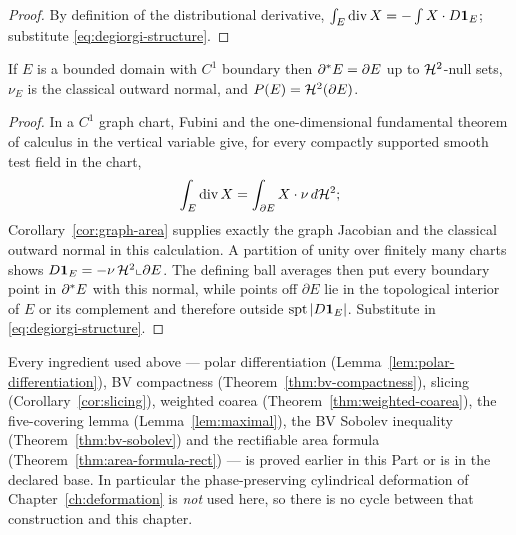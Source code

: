 \begin{proof}
By definition of the distributional derivative,
$\int_E\operatorname{div} X=-\int X\cdot D\mathbf 1_{E}$; substitute
\eqref{eq:degiorgi-structure}.
\end{proof}

\begin{corollary}\label{cor:smooth-perimeter}
If $E$ is a bounded domain with $C^1$ boundary then
$\partial^* E=\partial E$ up to $\mathcal H^2$-null sets, $\nu_E$ is the classical outward
normal, and $P(E)=\mathcal H^2(\partial E)$.
\end{corollary}

\begin{proof}
In a $C^1$ graph chart, Fubini and the one-dimensional fundamental theorem of
calculus in the vertical variable give, for every compactly supported smooth
test field in the chart,
\[
 \int_E\operatorname{div} X=\int_{\partial E}X\cdot\nu\,d\mathcal H^2;
\]
Corollary~\ref{cor:graph-area} supplies exactly the graph Jacobian and the
classical outward normal in this calculation.  A partition of unity over
finitely many charts shows
$D\mathbf 1_{E}=-\nu\,\mathcal H^2\llcorner\partial E$.  The defining ball averages then
put every boundary point in $\partial^* E$ with this normal, while points off
$\partial E$ lie in the topological interior of $E$ or its complement and
therefore outside $\operatorname{spt}|D\mathbf 1_{E}|$.  Substitute in
\eqref{eq:degiorgi-structure}.
\end{proof}

\begin{remark}\label{rem:degiorgi-deps}
Every ingredient used above --- polar differentiation
(Lemma~\ref{lem:polar-differentiation}), BV compactness
(Theorem~\ref{thm:bv-compactness}), slicing
(Corollary~\ref{cor:slicing}), weighted coarea
(Theorem~\ref{thm:weighted-coarea}), the five-covering lemma
(Lemma~\ref{lem:maximal}), the BV Sobolev inequality
(Theorem~\ref{thm:bv-sobolev}) and the rectifiable area formula
(Theorem~\ref{thm:area-formula-rect}) --- is proved earlier in this Part or is
in the declared base.  In particular the phase-preserving cylindrical
deformation of Chapter~\ref{ch:deformation} is \emph{not} used here, so there is no
cycle between that construction and this chapter.
\end{remark}

